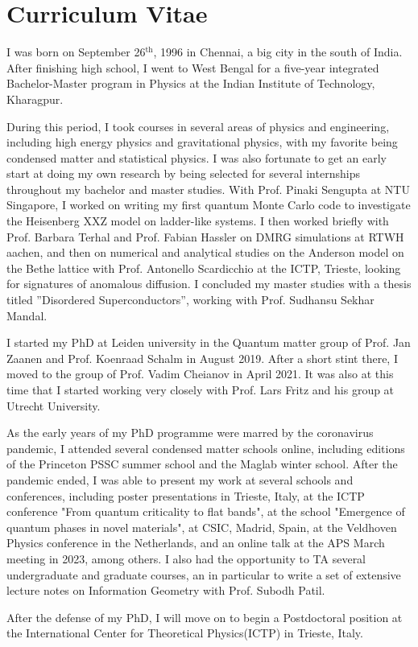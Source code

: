 \newpage
\thispagestyle{empty}

\chapter*{Curriculum Vitae} %
\label{Curriculum Vitae}

I was born on September 26${}^{\text{th}}$, 1996 in Chennai, a big city in the south of India. After finishing high school, I went to West Bengal for a five-year integrated Bachelor-Master program in Physics at the Indian Institute of Technology, Kharagpur.
\par
During this period, I took courses in several areas of physics and engineering, including high energy physics and gravitational physics, with my favorite being condensed matter and statistical physics. I was also fortunate to get an early start at doing my own research by being selected for several internships throughout my bachelor and master studies. With Prof. Pinaki Sengupta at NTU Singapore, I worked on writing my first quantum Monte Carlo code to investigate the Heisenberg XXZ model on ladder-like systems. I then worked briefly with Prof. Barbara Terhal and Prof. Fabian Hassler on DMRG simulations at RTWH aachen, and then on numerical and analytical studies on the Anderson model on the Bethe lattice with Prof. Antonello Scardicchio at the ICTP, Trieste, looking for signatures of anomalous diffusion. I concluded my master studies with a thesis titled ''Disordered Superconductors'', working with Prof. Sudhansu Sekhar Mandal. 
\par
I started my PhD at Leiden university in the Quantum matter group of Prof. Jan Zaanen and Prof. Koenraad Schalm in August 2019. After a short stint there, I moved to the group of Prof. Vadim Cheianov in April 2021. It was also at this time that I started working very closely with Prof. Lars Fritz and his group at Utrecht University. 
\par
As the early years of my PhD programme were marred by the coronavirus pandemic, I attended several condensed matter schools online, including editions of the Princeton PSSC summer school and the Maglab winter school. After the pandemic ended, I was able to present my work at several schools and conferences, including poster presentations in Trieste, Italy, at the ICTP conference "From quantum criticality to flat bands", at the school "Emergence of quantum phases in novel materials", at CSIC, Madrid, Spain, at the Veldhoven Physics conference in the Netherlands, and an online talk at the APS March meeting in 2023, among others. I also had the opportunity to TA several undergraduate and graduate courses, an in particular to write a set of extensive lecture notes on Information Geometry with Prof. Subodh Patil. 
\par
After the defense of my PhD, I will move on to begin a Postdoctoral position at the International Center for Theoretical Physics(ICTP) in Trieste, Italy. 

\newpage
\thispagestyle{empty}